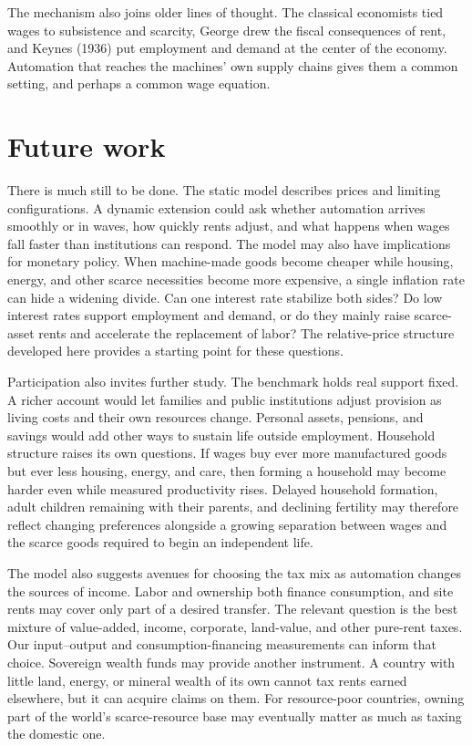 \documentclass[12pt]{article}
\theoremstyle{plain}
\begin{document}
The mechanism also joins older lines of thought. The classical economists tied wages to subsistence and scarcity, George drew the fiscal consequences of rent, and Keynes (1936) put employment and demand at the center of the economy. Automation that reaches the machines' own supply chains gives them a common setting, and perhaps a common wage equation.

\section{Future work}\label{sec:12}
There is much still to be done. The static model describes prices and limiting configurations. A dynamic extension could ask whether automation arrives smoothly or in waves, how quickly rents adjust, and what happens when wages fall faster than institutions can respond. The model may also have implications for monetary policy. When machine-made goods become cheaper while housing, energy, and other scarce necessities become more expensive, a single inflation rate can hide a widening divide. Can one interest rate stabilize both sides? Do low interest rates support employment and demand, or do they mainly raise scarce-asset rents and accelerate the replacement of labor? The relative-price structure developed here provides a starting point for these questions.

Participation also invites further study. The benchmark holds real support fixed. A richer account would let families and public institutions adjust provision as living costs and their own resources change. Personal assets, pensions, and savings would add other ways to sustain life outside employment. Household structure raises its own questions. If wages buy ever more manufactured goods but ever less housing, energy, and care, then forming a household may become harder even while measured productivity rises. Delayed household formation, adult children remaining with their parents, and declining fertility may therefore reflect changing preferences alongside a growing separation between wages and the scarce goods required to begin an independent life.

The model also suggests avenues for choosing the tax mix as automation changes the sources of income. Labor and ownership both finance consumption, and site rents may cover only part of a desired transfer. The relevant question is the best mixture of value-added, income, corporate, land-value, and other pure-rent taxes. Our input--output and consumption-financing measurements can inform that choice. Sovereign wealth funds may provide another instrument. A country with little land, energy, or mineral wealth of its own cannot tax rents earned elsewhere, but it can acquire claims on them. For resource-poor countries, owning part of the world's scarce-resource base may eventually matter as much as taxing the domestic one.
\end{document}
